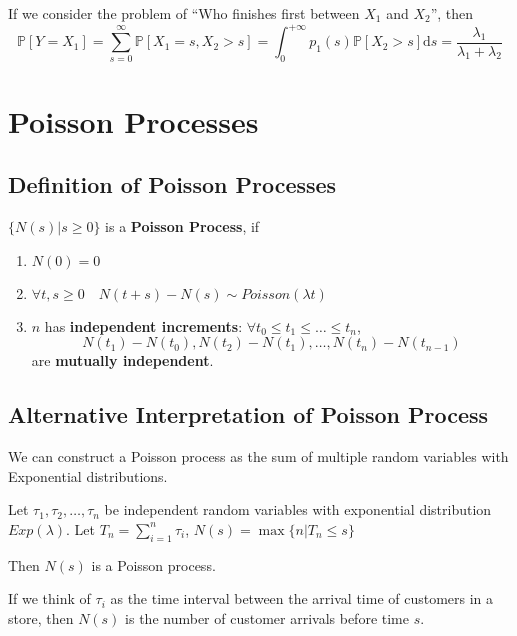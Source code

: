         If we consider the problem of ``Who finishes first between $X_1$ and $X_2$'', then
        \[ \mathbb{P}[Y=X_1]=\sum_{s=0}^\infty \mathbb{P}[X_1=s,X_2>s] = \int_0^{+\infty}p_1(s)\mathbb{P}[X_2>s]\mathrm{d}s = \frac{\lambda_1}{\lambda_1 + \lambda_2} \]


\section{Poisson Processes}

    \subsection{Definition of Poisson Processes}
    \begin{definition}\label{Def:PoissonProcess}
        $\{N(s)|s \ge 0\}$ is a \textbf{Poisson Process}, if
        \begin{enumerate}
            \item $N(0)=0$
            \item $\forall t, s \ge 0 \quad N(t+s) - N(s) \sim Poisson(\lambda t)$
            \item $n$ has \textbf{independent increments}: $\forall t_0 \le t_1 \le \dots \le t_n$,
            \[ N(t_1)-N(t_0), N(t_2)-N(t_1), \dots, N(t_n)-N(t_{n-1}) \]
            are \textbf{mutually independent}.
        \end{enumerate}
    \end{definition}

    \subsection{Alternative Interpretation of Poisson Process}
    We can construct a Poisson process as the sum of multiple random variables with Exponential distributions.
    \begin{proposition}\label{Prop:AltDefOfPoissonProcess}
        Let $\tau_1,\tau_2,\dots,\tau_n$ be independent random variables with exponential distribution $Exp(\lambda)$. Let $T_n=\sum_{i=1}^n\tau_i$, $N(s)=\max\{n|T_n \le s\}$

        Then $N(s)$ is a Poisson process.
    \end{proposition}
    \begin{remark}
        If we think of $\tau_i$ as the time interval between the arrival time of customers in a store, then $N(s)$ is the number of customer arrivals before time $s$.
    \end{remark}

